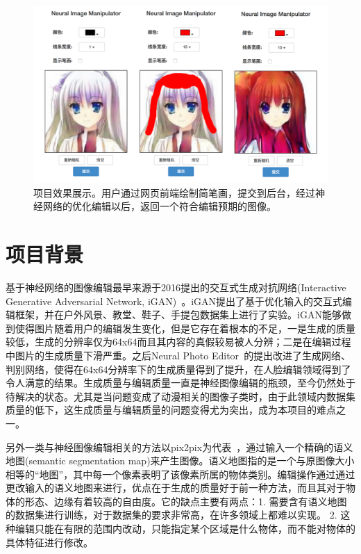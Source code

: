 \documentclass[a4paper,12pt,UTF8]{ctexart}
\newcommand{\kai}{\CJKfamily{zhkai}}	%
\begin{document}
\begin{figure}[H]
  \centering
  \includegraphics[width=0.9\linewidth]{figs/frontend.png}
  \caption{\kai 项目效果展示。用户通过网页前端绘制简笔画，提交到后台，经过神经网络的优化编辑以后，返回一个符合编辑预期的图像。}
  \label{fig:frontend}
\end{figure}


\section{项目背景}


基于神经网络的图像编辑最早来源于2016提出的交互式生成对抗网络(Interactive Generative Adversarial Network, iGAN)~\cite{Zhu2016Generative}。iGAN提出了基于优化输入的交互式编辑框架，并在户外风景、教堂、鞋子、手提包数据集上进行了实验。iGAN能够做到使得图片随着用户的编辑发生变化，但是它存在着根本的不足，一是生成的质量较低，生成的分辨率仅为64x64而且其内容的真假较易被人分辨；二是在编辑过程中图片的生成质量下滑严重。之后Neural Photo Editor~\cite{Brock2016Neural}的提出改进了生成网络、判别网络，使得在64x64分辨率下的生成质量得到了提升，在人脸编辑领域得到了令人满意的结果。生成质量与编辑质量一直是神经图像编辑的瓶颈，至今仍然处于待解决的状态。尤其是当问题变成了动漫相关的图像子类时，由于此领域内数据集质量的低下，这生成质量与编辑质量的问题变得尤为突出，成为本项目的难点之一。

另外一类与神经图像编辑相关的方法以pix2pix为代表~\cite{isola2016image}，通过输入一个精确的语义地图(semantic segmentation map)来产生图像。语义地图指的是一个与原图像大小相等的“地图”，其中每一个像素表明了该像素所属的物体类别。编辑操作通过通过更改输入的语义地图来进行，优点在于生成的质量好于前一种方法，而且其对于物体的形态、边缘有着较高的自由度。它的缺点主要有两点：1. 需要含有语义地图的数据集进行训练，对于数据集的要求非常高，在许多领域上都难以实现。 2. 这种编辑只能在有限的范围内改动，只能指定某个区域是什么物体，而不能对物体的具体特征进行修改。
\end{document}
